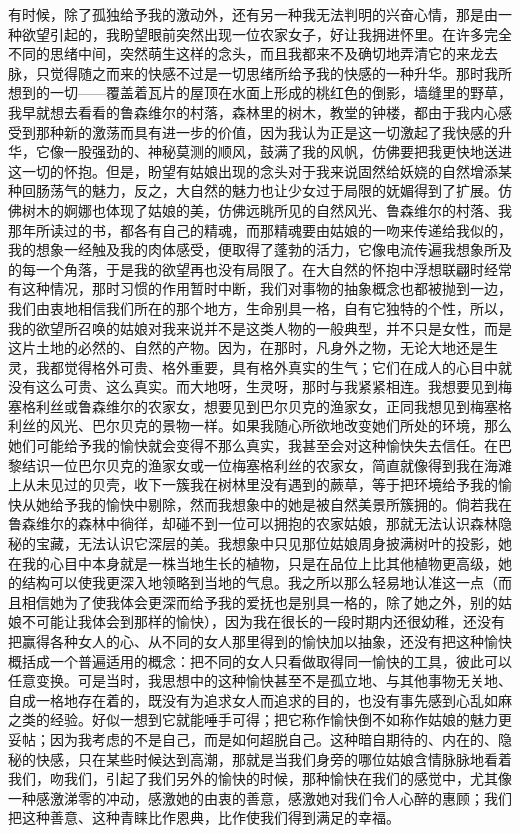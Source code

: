 \par 有时候，除了孤独给予我的激动外，还有另一种我无法判明的兴奋心情，那是由一种欲望引起的，我盼望眼前突然出现一位农家女子，好让我拥进怀里。在许多完全不同的思绪中间，突然萌生这样的念头，而且我都来不及确切地弄清它的来龙去脉，只觉得随之而来的快感不过是一切思绪所给予我的快感的一种升华。那时我所想到的一切——覆盖着瓦片的屋顶在水面上形成的桃红色的倒影，墙缝里的野草，我早就想去看看的鲁森维尔的村落，森林里的树木，教堂的钟楼，都由于我内心感受到那种新的激荡而具有进一步的价值，因为我认为正是这一切激起了我快感的升华，它像一股强劲的、神秘莫测的顺风，鼓满了我的风帆，仿佛要把我更快地送进这一切的怀抱。但是，盼望有姑娘出现的念头对于我来说固然给妖娆的自然增添某种回肠荡气的魅力，反之，大自然的魅力也让少女过于局限的妩媚得到了扩展。仿佛树木的婀娜也体现了姑娘的美，仿佛远眺所见的自然风光、鲁森维尔的村落、我那年所读过的书，都各有自己的精魂，而那精魂要由姑娘的一吻来传递给我似的，我的想象一经触及我的肉体感受，便取得了蓬勃的活力，它像电流传遍我想象所及的每一个角落，于是我的欲望再也没有局限了。在大自然的怀抱中浮想联翩时经常有这种情况，那时习惯的作用暂时中断，我们对事物的抽象概念也都被抛到一边，我们由衷地相信我们所在的那个地方，生命别具一格，自有它独特的个性，所以，我的欲望所召唤的姑娘对我来说并不是这类人物的一般典型，并不只是女性，而是这片土地的必然的、自然的产物。因为，在那时，凡身外之物，无论大地还是生灵，我都觉得格外可贵、格外重要，具有格外真实的生气；它们在成人的心目中就没有这么可贵、这么真实。而大地呀，生灵呀，那时与我紧紧相连。我想要见到梅塞格利丝或鲁森维尔的农家女，想要见到巴尔贝克的渔家女，正同我想见到梅塞格利丝的风光、巴尔贝克的景物一样。如果我随心所欲地改变她们所处的环境，那么她们可能给予我的愉快就会变得不那么真实，我甚至会对这种愉快失去信任。在巴黎结识一位巴尔贝克的渔家女或一位梅塞格利丝的农家女，简直就像得到我在海滩上从未见过的贝壳，收下一簇我在树林里没有遇到的蕨草，等于把环境给予我的愉快从她给予我的愉快中剔除，然而我想象中的她是被自然美景所簇拥的。倘若我在鲁森维尔的森林中徜徉，却碰不到一位可以拥抱的农家姑娘，那就无法认识森林隐秘的宝藏，无法认识它深层的美。我想象中只见那位姑娘周身披满树叶的投影，她在我的心目中本身就是一株当地生长的植物，只是在品位上比其他植物更高级，她的结构可以使我更深入地领略到当地的气息。我之所以那么轻易地认准这一点（而且相信她为了使我体会更深而给予我的爱抚也是别具一格的，除了她之外，别的姑娘不可能让我体会到那样的愉快），因为我在很长的一段时期内还很幼稚，还没有把赢得各种女人的心、从不同的女人那里得到的愉快加以抽象，还没有把这种愉快概括成一个普遍适用的概念：把不同的女人只看做取得同一愉快的工具，彼此可以任意变换。可是当时，我思想中的这种愉快甚至不是孤立地、与其他事物无关地、自成一格地存在着的，既没有为追求女人而追求的目的，也没有事先感到心乱如麻之类的经验。好似一想到它就能唾手可得；把它称作愉快倒不如称作姑娘的魅力更妥帖；因为我考虑的不是自己，而是如何超脱自己。这种暗自期待的、内在的、隐秘的快感，只在某些时候达到高潮，那就是当我们身旁的哪位姑娘含情脉脉地看着我们，吻我们，引起了我们另外的愉快的时候，那种愉快在我们的感觉中，尤其像一种感激涕零的冲动，感激她的由衷的善意，感激她对我们令人心醉的惠顾；我们把这种善意、这种青睐比作恩典，比作使我们得到满足的幸福。
